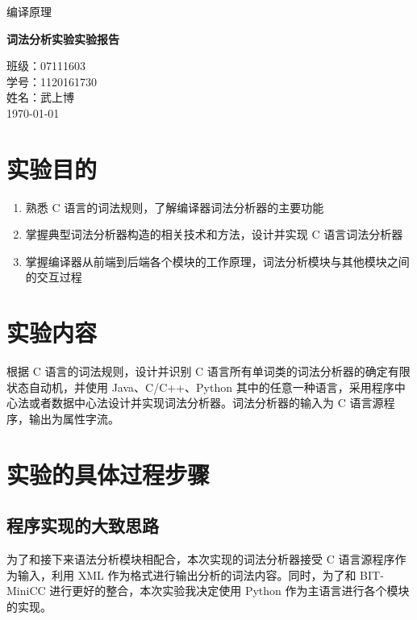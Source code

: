 \documentclass[UTF8]{ctexart}
\begin{document}
\begin{titlepage}
  \begin{center}
    \vspace*{1cm}

    \Large
    编译原理

    \vspace{0.5cm}
    \Huge
    \textbf{词法分析实验实验报告}

    \vfill

    \normalsize\kaishu
    班级：07111603 \\
    学号：1120161730 \\
    姓名：武上博 \\
    \today
    \vspace{1cm}
  \end{center}
\end{titlepage}

\tableofcontents
\newpage

\section{实验目的}
\begin{enumerate}
  \item 熟悉 C 语言的词法规则，了解编译器词法分析器的主要功能
  \item 掌握典型词法分析器构造的相关技术和方法，设计并实现 C 语言词法分析器
  \item 掌握编译器从前端到后端各个模块的工作原理，词法分析模块与其他模块之间的交互过程
\end{enumerate}

\section{实验内容}
根据 C 语言的词法规则，设计并识别 C 语言所有单词类的词法分析器的确定有限状态自动机，并使用 Java、C/C++、Python 其中的任意一种语言，采用程序中心法或者数据中心法设计并实现词法分析器。词法分析器的输入为 C 语言源程序，输出为属性字流。

\section{实验的具体过程步骤}
\subsection{程序实现的大致思路}
为了和接下来语法分析模块相配合，本次实现的词法分析器接受 C 语言源程序作为输入，利用 XML 作为格式进行输出分析的词法内容。同时，为了和 BIT-MiniCC 进行更好的整合，本次实验我决定使用 Python 作为主语言进行各个模块的实现。
\end{document}

